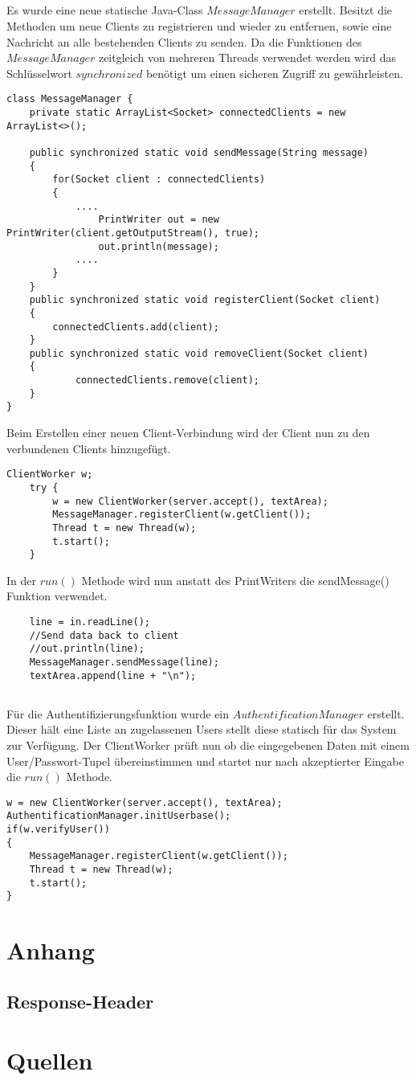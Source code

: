 \documentclass[12pt]{article}
\theoremstyle{plain}
\begin{document}
\subsection{}
Es wurde eine neue statische Java-Class $MessageManager$ erstellt.
Besitzt die Methoden um neue Clients zu registrieren und wieder zu entfernen, sowie eine Nachricht an alle bestehenden Clients zu senden.
Da die Funktionen des $MessageManager$ zeitgleich von mehreren Threads verwendet werden wird das Schlüsselwort $synchronized$ benötigt um einen sicheren Zugriff zu gewährleisten.
\begin{lstlisting}
class MessageManager {
	private static ArrayList<Socket> connectedClients = new ArrayList<>();

	public synchronized static void sendMessage(String message)
	{
		for(Socket client : connectedClients)
		{
			....			
				PrintWriter out = new PrintWriter(client.getOutputStream(), true);
				out.println(message);
			....
		}
	}
	public synchronized static void registerClient(Socket client)
	{
		connectedClients.add(client);
	}
	public synchronized static void removeClient(Socket client)
	{
			connectedClients.remove(client);
	}
}
\end{lstlisting}
Beim Erstellen einer neuen Client-Verbindung wird der Client nun zu den verbundenen Clients hinzugefügt.
\begin{lstlisting}
ClientWorker w;
	try {
		w = new ClientWorker(server.accept(), textArea);
		MessageManager.registerClient(w.getClient());
		Thread t = new Thread(w);
		t.start();
	}
\end{lstlisting}
In der $run()$ Methode wird nun anstatt des PrintWriters die sendMessage() Funktion verwendet.
\begin{lstlisting}
	line = in.readLine();
	//Send data back to client
	//out.println(line);
	MessageManager.sendMessage(line);
	textArea.append(line + "\n");
\end{lstlisting}
\subsection{}
Für die Authentifizierungsfunktion wurde ein $AuthentificationManager$ erstellt.
Dieser hält eine Liste an zugelassenen Users stellt diese statisch für das System zur Verfügung.
Der ClientWorker prüft nun ob die eingegebenen Daten mit einem User/Passwort-Tupel übereinstimmen und startet nur nach akzeptierter Eingabe die $run()$ Methode.
\begin{lstlisting}
w = new ClientWorker(server.accept(), textArea);
AuthentificationManager.initUserbase();
if(w.verifyUser())
{
	MessageManager.registerClient(w.getClient());
	Thread t = new Thread(w);
	t.start();
}
\end{lstlisting}
\subsection{}
\section{Anhang}
\subsection{Response-Header}
\section{Quellen}
\end{document}
